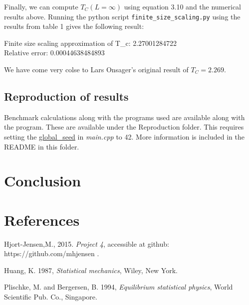 \documentclass[11pt,a4paper,english,draft]{article}
\numberwithin{equation}{section}
\begin{document}
Finally, we can compute $T_C(L=\infty)$ using equation 3.10 and the numerical results above. Running the python script \texttt{finite\_size\_scaling.py} using the results from table 1 gives the following result:

\begin{framed}
\noindent
Finite size scaling approximation of T\_c:  2.27001284722 \\
Relative error:  0.00044638484893
\end{framed}

We have come very colse to Lars Onsager's original result of $T_C = 2.269$. 


\subsection{Reproduction of results}

Benchmark calculations along with the programs used are available 
along with the program. These are available under the Reproduction folder.
This requires setting the 
\url{global_seed} in \emph{main.cpp} to 42. More information is included
in the README in this folder.

\section{Conclusion}

\section{References}
Hjort-Jensen,M., 2015. \emph{Project 4}, accessible at github: https://github.com/mhjensen .

Huang, K. 1987, \emph{Statistical mechanics}, Wiley, New York. 

Plischke, M. and Bergersen, B. 1994, \emph{Equilibrium statistical physics}, World Scientific Pub. Co., Singapore.
\end{document}
